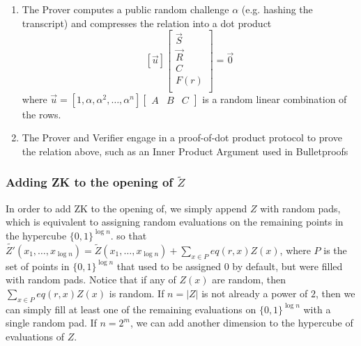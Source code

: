 \begin{mdframed}[style=zkprotocolwithheader, frametitle=Adding ZK to sumcheck]
\begin{enumerate}
    \item The Prover computes a public random challenge $\alpha$ (e.g. hashing the transcript) and compresses the relation into a dot product
    \begin{equation} \label{eqn:rlc-vector-reln}
        [\vec{u}]
        \left[\begin{array}{c}
            \vec{S} \\
            \hline
            \vec{R} \\
            \hline
            C \\
            F(r) \\
        \end{array}\right]
        = 
        \vec{0}
    \end{equation}
    where $\vec{u} = [1, \alpha, \alpha^2, \dots, \alpha^n] \left[\begin{array}{c|c|c}
        A & B & C
    \end{array}\right]$ is a random linear combination of the rows.
    \item The Prover and Verifier engage in a proof-of-dot product protocol to prove the relation above, such as an Inner Product Argument used in Bulletproofs \cite{cryptoeprint:2017/1066}
    \end{enumerate}
\end{mdframed}

\subsubsection{Adding ZK to the opening of $\widetilde{Z}$}\label{subsubsec:zk-open-Z}

In order to add ZK to the opening of, we simply append $Z$ with random pads, which is equivalent to assigning random evaluations on the remaining points in the hypercube $\{0,1\}^{\log n}$.
so that $\widetilde{Z'}(x_1, \dots, x_{\log n}) = \widetilde{Z}(x_1, \dots, x_{\log n}) + \sum_{x \in P}eq(r, x)Z(x)$,
where $P$ is the set of points in $\{0,1\}^{\log n}$ that used to be assigned $0$ by default, but were filled with random pads. Notice that if any of $Z(x)$ are random, then $\sum_{x \in P}eq(r, x)Z(x)$ is random.
If $n=|Z|$ is not already a power of $2$, then we can simply fill at least one of the remaining evaluations on $\{0,1\}^{\log n}$ with a single random pad. 
If $n=2^m$, we can add another dimension to the hypercube of evaluations of $Z$. 


